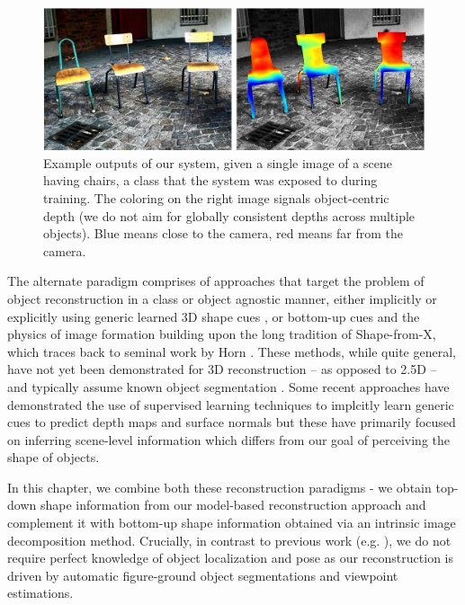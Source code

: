 \begin{figure}[t]
\includegraphics[width = \textwidth]{figures/categoryshapes/teaserChair.pdf}
\caption{Example outputs of our system, given a single image of a scene having chairs, a class that the system was exposed to during training. The coloring on the right image signals object-centric depth (we do not aim for globally consistent depths across multiple objects). Blue means close to the camera, red means far from the camera.}
\end{figure}

The alternate paradigm comprises of approaches that target the problem of object reconstruction in a class or object agnostic manner, either implicitly or explicitly using generic learned 3D shape cues \cite{hoiem2005automatic, saxena2009make3d}, or bottom-up cues and the physics of image formation \cite{Karsch2013,barronPAMI13} building upon the long tradition of Shape-from-X, which traces back to seminal work by Horn \cite{HORNThesis1970}. These methods, while quite general, have not yet been demonstrated for 3D reconstruction -- as opposed to 2.5D -- and typically assume known object segmentation \cite{barronPAMI13}. Some recent approaches have demonstrated the use of supervised learning techniques to implcitly learn generic cues to predict depth maps \cite{eigennips14} and surface normals \cite{eigen2015predicting, wang2015designing} but these have primarily focused on  inferring scene-level information which differs from our goal of perceiving the shape of objects.

In this chapter, we combine both these reconstruction paradigms - we obtain top-down shape information from our model-based reconstruction approach and complement it with bottom-up shape information obtained via an intrinsic image decomposition method.  Crucially, in contrast to previous work (e.g. \cite{barronPAMI13,carvi14,cashman2013dolphins}), we do not require perfect knowledge of object localization and pose as our reconstruction is driven by automatic figure-ground object segmentations and viewpoint estimations.

